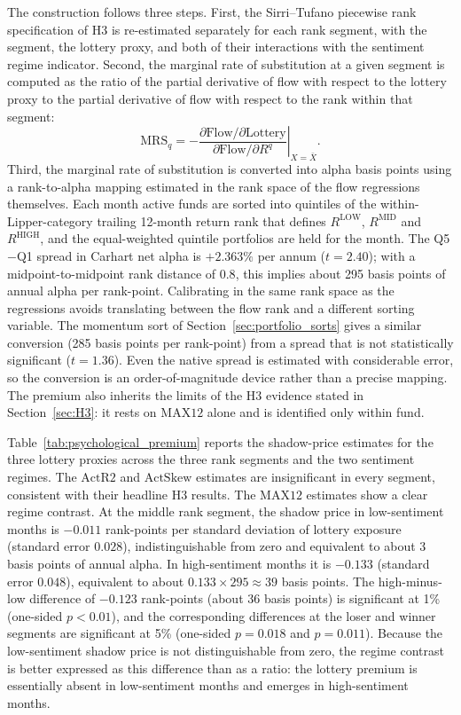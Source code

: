 \documentclass[12pt, oneside]{report}
\begin{document}
The construction follows three steps. First, the Sirri--Tufano piecewise
rank specification of H3 is re-estimated separately for each rank
segment, with the segment, the lottery proxy, and both of their
interactions with the sentiment regime indicator. Second, the marginal
rate of substitution at a given segment is computed as the ratio of the
partial derivative of flow with respect to the lottery proxy to the
partial derivative of flow with respect to the rank within that segment:
\begin{equation}
\label{eq:mrs}
\text{MRS}_q = -\left.\frac{\partial \text{Flow} / \partial \text{Lottery}}{\partial \text{Flow} / \partial R^q}\right|_{X = \bar{X}}.
\end{equation}
Third, the marginal rate of substitution is converted into alpha basis
points using a rank-to-alpha mapping estimated in the rank space of the
flow regressions themselves. Each month active funds are sorted into
quintiles of the within-Lipper-category trailing 12-month return rank
that defines $R^{\text{LOW}}$, $R^{\text{MID}}$ and $R^{\text{HIGH}}$, and
the equal-weighted quintile portfolios are held for the month. The
Q5$-$Q1 spread in Carhart net alpha is $+2.363\%$ per annum ($t = 2.40$);
with a midpoint-to-midpoint rank distance of $0.8$, this implies about
295 basis points of annual alpha per rank-point. Calibrating in the same
rank space as the regressions avoids translating between the flow rank
and a different sorting variable. The momentum sort of
Section~\ref{sec:portfolio_sorts} gives a similar conversion (285 basis
points per rank-point) from a spread that is not statistically
significant ($t = 1.36$). Even the native spread is estimated with
considerable error, so the conversion is an order-of-magnitude device
rather than a precise mapping. The premium also inherits the limits of
the H3 evidence stated in Section~\ref{sec:H3}: it rests on
$\text{MAX12}$ alone and is identified only within fund.

Table~\ref{tab:psychological_premium} reports the shadow-price estimates
for the three lottery proxies across the three rank segments and the two
sentiment regimes. The $\text{ActR2}$ and $\text{ActSkew}$ estimates are
insignificant in every segment, consistent with their headline H3
results. The $\text{MAX12}$ estimates show a clear regime contrast. At
the middle rank segment, the shadow price in low-sentiment months is
$-0.011$ rank-points per standard deviation of lottery exposure (standard
error $0.028$), indistinguishable from zero and equivalent to about 3
basis points of annual alpha. In high-sentiment months it is $-0.133$
(standard error $0.048$), equivalent to about $0.133 \times 295 \approx 39$
basis points. The high-minus-low difference of $-0.123$ rank-points (about
36 basis points) is significant at 1\% (one-sided $p < 0.01$), and the
corresponding differences at the loser and winner segments are
significant at 5\% (one-sided $p = 0.018$ and $p = 0.011$). Because the
low-sentiment shadow price is not distinguishable from zero, the regime
contrast is better expressed as this difference than as a ratio: the
lottery premium is essentially absent in low-sentiment months and
emerges in high-sentiment months.
\end{document}

